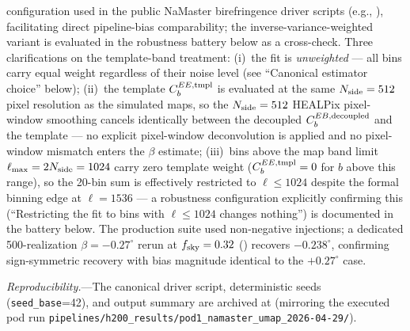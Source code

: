 \documentclass[aps,prd,twocolumn,superscriptaddress,showpacs,preprintnumbers,nofootinbib,longbibliography,floatfix]{revtex4-2}
\begin{document}
configuration used in the public NaMaster birefringence driver scripts
(e.g., \cite{Eskilt2022}), facilitating direct pipeline-bias comparability;
the inverse-variance-weighted variant is evaluated in the robustness battery
below as a cross-check.
Three clarifications on the template-band treatment: (i)~the fit is
\emph{unweighted} --- all bins carry equal weight regardless of their noise level
(see ``Canonical estimator choice'' below); (ii)~the template $C_b^{EE,\rm tmpl}$
is evaluated at the same $N_{\rm side}=512$ pixel resolution as the simulated maps,
so the $N_{\rm side}=512$ HEALPix pixel-window smoothing cancels identically
between the decoupled $C_b^{EB,\rm decoupled}$ and the template --- no explicit
pixel-window deconvolution is applied and no pixel-window mismatch enters the
$\beta$ estimate; (iii)~bins above the map band limit $\ell_{\rm max}=2N_{\rm side}=1024$
carry zero template weight ($C_b^{EE,\rm tmpl}=0$ for $b$ above this range),
so the 20-bin sum is effectively restricted to $\ell \le 1024$ despite the
formal binning edge at $\ell=1536$ --- a robustness configuration explicitly
confirming this (``Restricting the fit to bins with $\ell\le 1024$ changes
nothing'') is documented in the battery below.
The production suite used non-negative injections; a dedicated 500-realization
$\beta=-0.27^\circ$ rerun at $f_{\rm sky}=0.32$
()
recovers $-0.238^\circ$, confirming sign-symmetric recovery with bias
magnitude identical to the $+0.27^\circ$ case.

\emph{Reproducibility.}---The canonical driver script, deterministic seeds
(\texttt{seed\_base}=42), and output summary are archived at
 (mirroring the executed pod run
\texttt{pipelines/h200\_results/\allowbreak pod1\_namaster\_umap\_2026-04-29/}).
\end{document}
